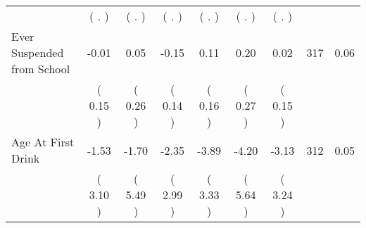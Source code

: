 \begin{tabular}{lcccccccc}
 & (        . ) & (        . ) & (        . ) & (        . ) & (        . ) & (        . ) & \\
Ever Suspended from School &     -0.01 &      0.05 &     -0.15 &      0.11 &      0.20 &      0.02 & 317 &       0.06 \\ 
 & (     0.15 ) & (     0.26 ) & (     0.14 ) & (     0.16 ) & (     0.27 ) & (     0.15 ) & \\
Age At First Drink &     -1.53 &     -1.70 &     -2.35 &     -3.89 &     -4.20 &     -3.13 & 312 &       0.05 \\ 
 & (     3.10 ) & (     5.49 ) & (     2.99 ) & (     3.33 ) & (     5.64 ) & (     3.24 ) & \\
\bottomrule
\end{tabular}
